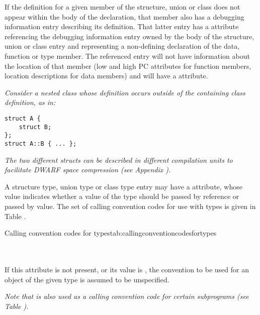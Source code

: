 If the definition for a given member of the structure, union
or class does not appear within the body of the declaration,
that member also has a debugging information entry describing
its definition. That latter entry has a 
\DWATspecification{} attribute 
referencing the debugging information entry
owned by the body of the structure, union or class entry and
representing a non-defining declaration of the data, function
or type member. The referenced entry will not have information
about the location of that member (low and high PC attributes
for function members, location descriptions for data members)
and will have a \DWATdeclaration{} attribute.

\textit{Consider a nested class whose 
definition occurs outside of the containing class definition, as in:}

\begin{lstlisting}[numbers=none]
struct A {
    struct B;
};
struct A::B { ... };
\end{lstlisting}

\textit{The two different structs can be described in 
different compilation units to 
facilitate DWARF space compression 
(see Appendix ).}

A structure type, union type or class type entry may have a
\DWATcallingconventionDEFN{} attribute,
whose value indicates whether a value of the type should be passed by reference 
or passed by value. The set of calling convention codes for use with types 
is\hypertarget{chap:DWATcallingconventionfortypes}{}
given in Table .

\begin{simplenametable}[2.2in]{Calling convention codes for types}{tab:callingconventioncodesfortypes}
\DWCCnormal             \\
\DWCCpassbyvalueTARG        \\
\DWCCpassbyreferenceTARG    \\
\end{simplenametable}

If this attribute is not present, or its value is
\DWCCnormalNAME, the convention to be used for an object of the
given type is assumed to be unspecified.

\textit{Note that \DWCCnormalNAME{} is also used as a calling convention 
code for certain subprograms 
(see Table ).}

